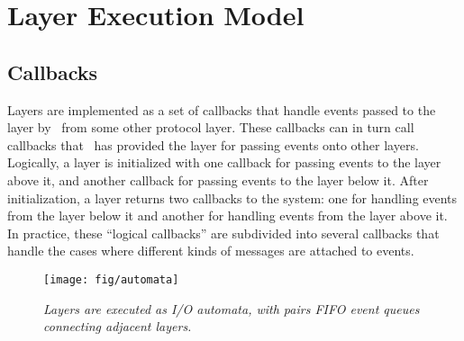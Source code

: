 %
%
%
\section{Layer Execution Model}

\subsection{Callbacks}
Layers are implemented as a set of callbacks that handle events passed to
the layer by \ensemble\ from some other protocol layer.  These callbacks can in
turn call callbacks that \ensemble\ has provided the layer for passing events
onto other layers.  Logically, a layer is initialized with one callback for
passing events to the layer above it, and another callback for passing
events to the layer below it.  After initialization, a layer returns two
callbacks to the system: one for handling events from the layer below it
and another for handling events from the layer above it.  In practice,
these ``logical callbacks'' are subdivided into several callbacks that
handle the cases where different kinds of messages are attached to events.

\begin{figure}[tb]
\begin{center}
\texttt{[image: fig/automata]}
\end{center}
\caption{\em Layers are executed as I/O automata, with pairs FIFO event
queues connecting adjacent layers.}
\label{fig:automata}
\end{figure}

